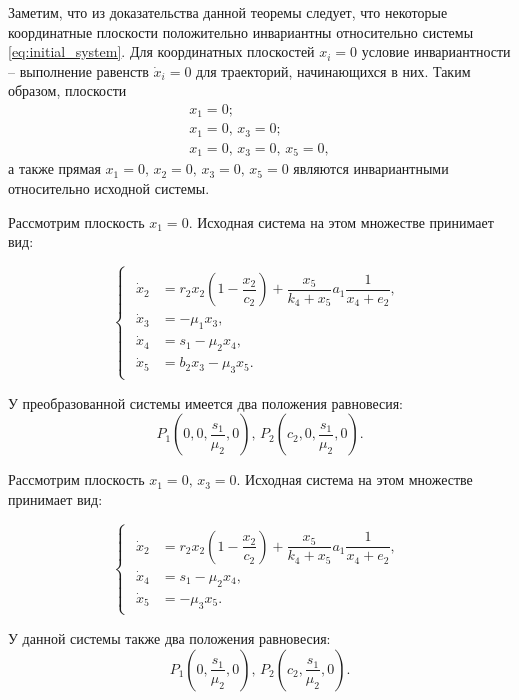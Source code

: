 \documentclass[12pt,a4paper]{extarticle}
\theoremstyle{definition}
\theoremstyle{definition}
\theoremstyle{definition}
\begin{document}
	Заметим, что из доказательства данной теоремы следует, что некоторые координатные плоскости положительно инвариантны относительно системы \ref{eq:initial_system}. Для координатных плоскостей $x_i=0$ условие инвариантности -- выполнение равенств $\dot{x}_i=0$ для траекторий, начинающихся в них. Таким образом, плоскости  
	\begin{gather*}
		x_1=0;\\
		x_1=0,\, x_3=0;\\
		x_1=0,\, x_3=0,\, x_5=0,
	\end{gather*}
	а также прямая $x_1=0,\, x_2=0,\, x_3=0,\, x_5=0$ являются инвариантными относительно исходной системы.  
	
	Рассмотрим плоскость $x_1=0$. Исходная система на этом множестве принимает вид:
	
	\begin{equation*}
		\begin{cases}
			\begin{aligned}
				\dot{x}_2 &= r_2x_2\left(1-\dfrac{x_2}{c_2}\right)+\dfrac{x_5}{k_4+x_5}a_1\dfrac{1}{x_4+e_2},\\
				\dot{x}_3 &= -\mu_1x_3,\\
				\dot{x}_4 &= s_1 - \mu_2x_4,\\
				\dot{x}_5 &= b_2x_3-\mu_3x_5.
			\end{aligned}
		\end{cases}
	\end{equation*}
	
	У преобразованной системы имеется два положения равновесия:
	\[P_1\left(0,0,\frac{s_1}{\mu_2},0\right),\, P_2\left(c_2,0,\frac{s_1}{\mu_2},0\right).\]
	
	Рассмотрим плоскость $x_1=0,\, x_3=0$. Исходная система на этом множестве принимает вид:
	
	\begin{equation*}
		\begin{cases}
			\begin{aligned}
				\dot{x}_2 &= r_2x_2\left(1-\dfrac{x_2}{c_2}\right)+\dfrac{x_5}{k_4+x_5}a_1\dfrac{1}{x_4+e_2},\\
				\dot{x}_4 &= s_1 -\mu_2x_4,\\
				\dot{x}_5 &= -\mu_3x_5.
			\end{aligned}
		\end{cases}
	\end{equation*}
	
	У данной системы также два положения равновесия:
	\[P_1\left(0,\frac{s_1}{\mu_2},0\right),\, P_2\left(c_2,\frac{s_1}{\mu_2},0\right).\]
	
\end{document}
